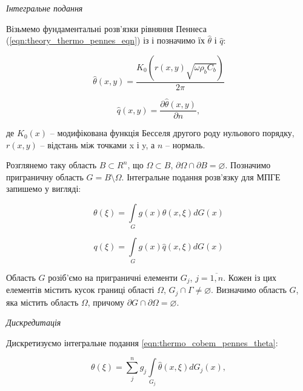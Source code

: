 \begin{center}
  \textit{Інтегральне подання}
\end{center}

Візьмемо фундаментальні розв'язки рівняння Пеннеса (\ref{eqn:theory_thermo_pennes_eqn}) із
\cite{pennes-equation-bem-fundamental-solutions} і позначимо їх $\hat{\theta}$ і $\hat{q}$: 

\begin{equation*}
  \hat{\theta}(x, y) = \frac{K_0(r(x, y) \sqrt{\omega \rho_b C_b})}{2\pi}
\end{equation*}

\begin{equation*}
  \hat{q}(x, y) = \frac{\partial \hat{\theta}(x, y)}{\partial n},
\end{equation*}

\noindent де $K_0(x)$ -- модифікована функція Бесселя другого роду нульового порядку, $r(x, y)$ -- відстань між точками
x і y, а $n$ -- нормаль.

Розглянемо таку область $B \subset R^n$, що $\Omega \subset B$, $\partial\Omega \cap \partial B = \varnothing$.
  Позначимо приграничну область $G = B \setminus \Omega$. Інтегральне подання розв'язку для МПГЕ запишемо у вигляді:

\begin{equation}
  \label{eqn:thermo_cobem_pennes_theta}
  \theta(\xi) = \int \limits_G g(x)\hat{\theta}(x,\xi)dG(x)
\end{equation}

\begin{equation}
  \label{eqn:thermo_cobem_pennes_q}
  q(\xi) = \int \limits_G g(x)\hat{q}(x,\xi)dG(x)
\end{equation}

Область $G$ розіб'ємо на приграничні елементи $G_j$, $j=\overline{1,n}$. Кожен із цих елементів містить кусок границі
області $\Omega$, $G_j \cap \Gamma \neq \varnothing$. Визначимо область $G$, яка містить область $\Omega$, причому
$\partial G \cap \partial \Omega = \varnothing$.

\begin{center}
  \textit{Дискредитація}
\end{center}

Дискретизуємо інтегральне подання \ref{eqn:thermo_cobem_pennes_theta}:

\begin{equation}
  \label{eqn:thermo_cobem_pennes_theta_discrete}
  \theta(\xi) = \sum_j^n g_j  \int \limits_{G_j} \hat{\theta}(x,\xi)dG_j(x),
\end{equation}

